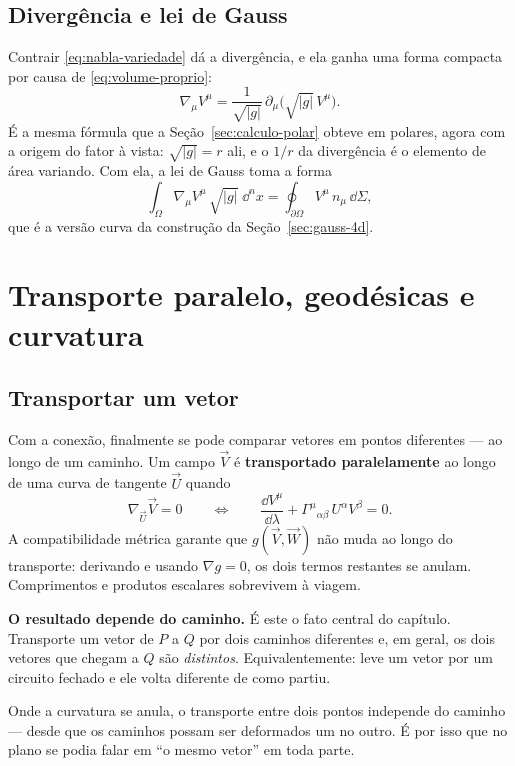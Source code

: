 \documentclass[12pt,a4paper,oneside]{book}
\theoremstyle{rgplain}
\theoremstyle{rgremark}
\begin{document}
\subsection*{Divergência e lei de Gauss}

Contrair \eqref{eq:nabla-variedade} dá a divergência, e ela ganha uma forma
compacta por causa de \eqref{eq:volume-proprio}:
\begin{equation}
  \nabla_\mu V^\mu=\frac{1}{\sqrt{|g|}}\,
  \partial_\mu\bigl(\sqrt{|g|}\,V^\mu\bigr) .
  \label{eq:divergencia-sqrtg}
\end{equation}
É a mesma fórmula que a Seção~\ref{sec:calculo-polar} obteve em polares, agora
com a origem do fator à vista: $\sqrt{|g|}=r$ ali, e o $1/r$ da divergência é
o elemento de área variando. Com ela, a lei de Gauss toma a forma
\begin{equation}
  \int_\Omega \nabla_\mu V^\mu\,\sqrt{|g|}\;\dd^nx
  =\oint_{\partial\Omega} V^\mu\,n_\mu\,\dd\Sigma ,
  \label{eq:gauss-variedade}
\end{equation}
que é a versão curva da construção da Seção~\ref{sec:gauss-4d}.

\section{Transporte paralelo, geodésicas e curvatura}
\label{sec:transporte-paralelo}

\subsection*{Transportar um vetor}

Com a conexão, finalmente se pode comparar vetores em pontos diferentes --- ao
longo de um caminho. Um campo $\vec V$ é \textbf{transportado paralelamente}
ao longo de uma curva de tangente $\vec U$ quando
\begin{equation}
  \nabla_{\vec U}\vec V=0
  \qquad\Longleftrightarrow\qquad
  \frac{\dd V^\mu}{\dd\lambda}
  +\Gamma^\mu{}_{\alpha\beta}\,U^\alpha V^\beta=0 .
  \label{eq:transporte-paralelo}
\end{equation}
A compatibilidade métrica garante que $g(\vec V,\vec W)$ não muda ao longo do
transporte: derivando e usando $\nabla g=0$, os dois termos restantes se
anulam. Comprimentos e produtos escalares sobrevivem à viagem.

\begin{central}
\textbf{O resultado depende do caminho.} É este o fato central do capítulo.
Transporte um vetor de $P$ a $Q$ por dois caminhos diferentes e, em geral, os
dois vetores que chegam a $Q$ são \emph{distintos}. Equivalentemente: leve um
vetor por um circuito fechado e ele volta diferente de como partiu.

Onde a curvatura se anula, o transporte entre dois pontos independe do caminho
--- desde que os caminhos possam ser deformados um no outro. É por isso que no
plano se podia falar em ``o mesmo vetor'' em toda parte.
\end{central}
\end{document}

